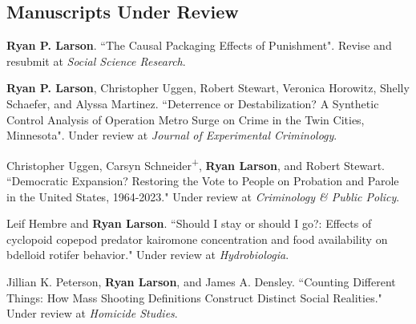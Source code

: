 \documentclass[letterpaper]{article}
\newenvironment{publist}{%
  \begin{list}{}{%
    \setlength{\leftmargin}{0cm}   %
    \setlength{\labelwidth}{2cm}     %
    \setlength{\labelsep}{0.5cm}     %
  }%
}{%
  \end{list}%
}
\begin{document}
\subsection*{Manuscripts Under Review}
\begin{publist}

\item \textbf{Ryan P. Larson}. ``The Causal Packaging Effects of Punishment". Revise and resubmit at \textit{Social Science Research}.

\item \textbf{Ryan P. Larson}, Christopher Uggen, Robert Stewart, Veronica Horowitz, Shelly Schaefer, and Alyssa Martinez. ``Deterrence or Destabilization? A Synthetic Control Analysis of Operation Metro Surge on Crime in the Twin Cities, Minnesota". Under review at \textit{Journal of Experimental Criminology}. 

\item Christopher Uggen, Carsyn Schneider\textsuperscript{+}, \textbf{Ryan Larson}, and Robert Stewart. ``Democratic Expansion? Restoring the Vote to People on Probation and Parole in the United States, 1964-2023." Under review at \textit{Criminology \& Public Policy}.

\item Leif Hembre and \textbf{Ryan Larson}. ``Should I stay or should I go?: Effects of cyclopoid copepod predator kairomone concentration and food availability on bdelloid rotifer behavior." Under review at \textit{Hydrobiologia}.

\item Jillian K. Peterson, \textbf{Ryan Larson}, and James A. Densley. ``Counting Different Things: How Mass Shooting Definitions Construct Distinct Social Realities." Under review at \textit{Homicide Studies}.


\end{publist}
\end{document}
